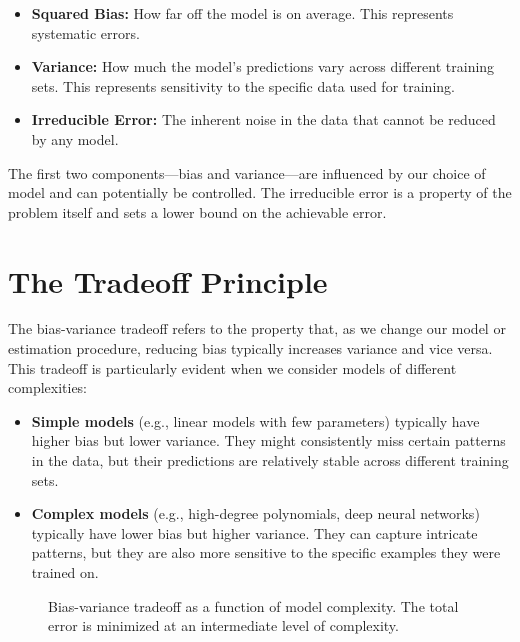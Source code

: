 \documentclass{article}
\begin{document}
\begin{itemize}
\item \textbf{Squared Bias:} How far off the model is on average. This represents systematic errors.
\item \textbf{Variance:} How much the model's predictions vary across different training sets. This represents sensitivity to the specific data used for training.
\item \textbf{Irreducible Error:} The inherent noise in the data that cannot be reduced by any model.
\end{itemize}

The first two components—bias and variance—are influenced by our choice of model and can potentially be controlled. The irreducible error is a property of the problem itself and sets a lower bound on the achievable error.

\section{The Tradeoff Principle}

The bias-variance tradeoff refers to the property that, as we change our model or estimation procedure, reducing bias typically increases variance and vice versa. This tradeoff is particularly evident when we consider models of different complexities:

\begin{itemize}
\item \textbf{Simple models} (e.g., linear models with few parameters) typically have higher bias but lower variance. They might consistently miss certain patterns in the data, but their predictions are relatively stable across different training sets.
\item \textbf{Complex models} (e.g., high-degree polynomials, deep neural networks) typically have lower bias but higher variance. They can capture intricate patterns, but they are also more sensitive to the specific examples they were trained on.
\end{itemize}

\begin{figure}[h]
\centering
{}
\caption{Bias-variance tradeoff as a function of model complexity. The total error is minimized at an intermediate level of complexity.}
\end{figure}
\end{document}
